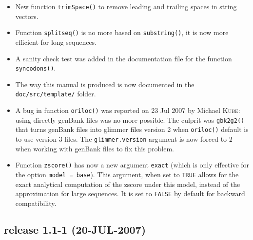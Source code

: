 \documentclass{article}
\begin{document}
\begin{itemize}

\item New function \texttt{trimSpace()} to remove leading and trailing
  spaces in string vectors.

\item Function \texttt{splitseq()} is no more based on \texttt{substring()},
  it is now more efficient for long sequences.

\item A sanity check test was added in the documentation file
  for the function \texttt{syncodons()}.

\item The way this manual is produced is now documented in the
  \texttt{doc/src/template/} folder.

\item A bug in function \texttt{oriloc()} was reported on 23 Jul 2007
  by Michael \textsc{Kube}: using directly genBank files was no more possible.
  The culprit was \texttt{gbk2g2()} that turns genBank files into
  glimmer files version 2 when \texttt{oriloc()} default is to use
  version 3 files. The \texttt{glimmer.version} argument is now forced
  to 2 when working with genBank files to fix this problem.

\item Function \texttt{zscore()} has now a new argument
  \texttt{exact} (which is only effective for the option
  \texttt{model = base}). This argument, when set to
  \texttt{TRUE} allows for the exact analytical computation
  of the zscore under this model, instead of the approximation for
  large sequences. It is set to \texttt{FALSE} by
  default for backward compatibility.
\end{itemize}

\subsection*{release 1.1-1 (20-JUL-2007)}
\end{document}
